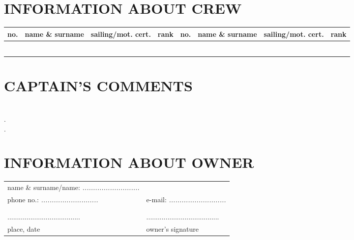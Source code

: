 \documentclass{article}
\begin{document}
\section*{INFORMATION ABOUT CREW}
    \begin{tabular}{|m{}|m{}|m{}|m{}||m{}|m{}|m{}|m{}|}
    \hline
    no. & name \& surname & sailing/mot. cert. & rank & no. & name \& surname &sailing/mot. cert. & rank\\
    \hline
    
&&&&&&&\\
\hline
&&&&&&&\\
\hline
&&&&&&&\\
\hline
&&&&&&&\\
\hline
&&&&&&&\\
\hline
&&&&&&&\\
\hline

    \end{tabular}
    
    
\section*{CAPTAIN'S COMMENTS}


\textit{}\dotfill \\
.\dotfill \\
.\dotfill \\
\section*{INFORMATION ABOUT OWNER}

\begin{tabularx}{\textwidth}{X X}
name \& surname/name: \textit{...........................} \\
phone no.: \textit{...........................} & e-mail: \textit{...........................}\\
\\\\
...................................... & ......................................\\
place, date & owner's signature\\
\end{tabularx}
\end{document}
